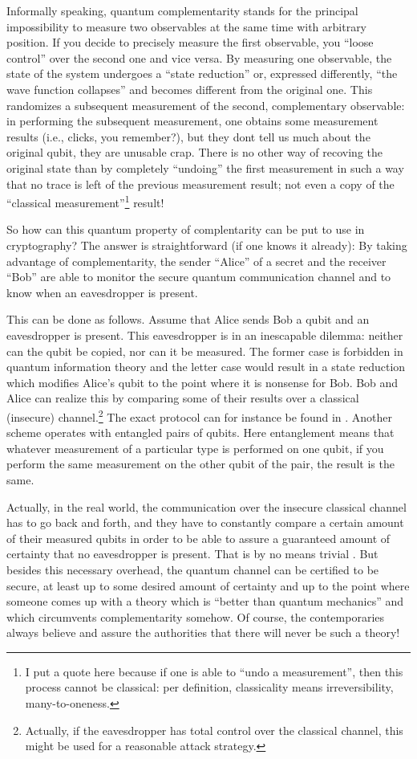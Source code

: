 \documentclass [11pt]{llncs}
\begin{document}
Informally speaking, quantum complementarity
stands for the principal impossibility to measure two observables
at the same time with arbitrary position.
If you decide to precisely measure the first observable, you ``loose control''
over the second one and vice versa.
By measuring one observable, the state of the system undergoes a ``state reduction''
or, expressed differently,  ``the wave function collapses''
and becomes  different from the original one.
This randomizes a  subsequent measurement of the second, complementary
observable: in performing the subsequent measurement,
one obtains some measurement results (i.e., clicks,
you remember?), but they dont tell us much about the original qubit, they are unusable crap.
There is no other way of recoving the original state than by completely
``undoing'' the first measurement in such a way that no trace is left of the previous
measurement result; not even a copy of the ``classical measurement''\footnote{I put
a quote here because if one is able to ``undo a measurement'', then
this process cannot be classical: per definition,
classicality means irreversibility, many-to-oneness.}
 result!

So how can this quantum property of complentarity can be put to use in cryptography?
The answer is straightforward (if one knows it already):
By taking advantage of complementarity,
the sender ``Alice'' of a secret and the receiver ``Bob''
are able to monitor the secure quantum communication channel and to know when an eavesdropper is present.

This can be done as follows.
Assume that Alice sends Bob a qubit
and an eavesdropper is present.
This eavesdropper is in an inescapable dilemma:
neither can the qubit be copied, nor can it be measured.
The former case is forbidden in quantum information theory
and the letter case would result in a state reduction which modifies Alice's qubit
to the point where it is nonsense for Bob.
Bob and Alice can realize this by comparing some of their results  over a classical
(insecure) channel.\footnote{Actually, if the eavesdropper has total control over the classical channel,
this might be used for a reasonable attack strategy.}
The exact protocol can for instance be found in \cite{benn-92}.
Another scheme \cite{ekert91} operates with entangled pairs of
qubits. Here
entanglement  means that whatever measurement of a particular type is performed on one qubit,
if you perform the same measurement on the other qubit of the pair, the result is the same.


Actually, in the real world, the communication over
the insecure classical channel has to go back and forth,
and they have to constantly compare a certain amount of their measured qubits in order
to be able to assure a guaranteed amount of certainty that no eavesdropper is present.
That is by no means trivial \cite{gilbert-hamrick-200009}.
But besides this necessary overhead, the quantum channel can be certified to be secure,
at least up to some desired amount of certainty and
up to the point where someone comes up with a theory which is ``better than quantum mechanics''
and which circumvents complementarity somehow.
Of course, the contemporaries always believe and assure the authorities that there will never be such a theory!
\end{document}
